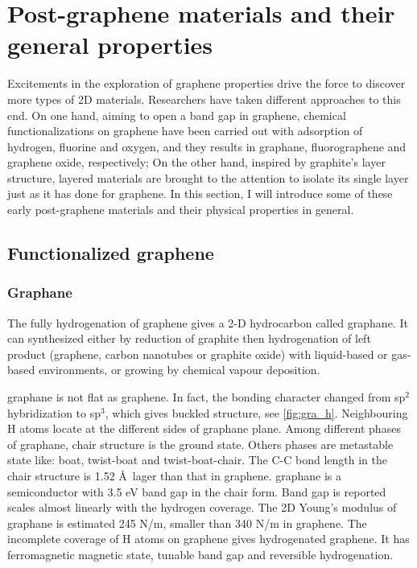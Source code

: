 \section{Post-graphene materials and their general properties}

Excitements in the exploration of graphene properties drive the force to discover more types of 2D materials. Researchers have taken different approaches to this end. On one hand, aiming to open a band gap in graphene, chemical functionalizations on graphene have been carried out with adsorption of hydrogen, fluorine and oxygen, and they results in graphane, fluorographene and graphene oxide, respectively; On the other hand, inspired by graphite's layer structure, layered materials are brought to the attention to isolate its single layer just as it has done for graphene. In this section, I will introduce some of these early post-graphene materials and their physical properties in general.

\subsection{Functionalized graphene}

\subsubsection{Graphane}

The fully hydrogenation of graphene gives a 2-D hydrocarbon called graphane. It can synthesized either by reduction of graphite then hydrogenation of left product (graphene, carbon nanotubes or graphite oxide) with liquid-based\cite{Yang2012} or gas-based\cite{Burgess2011} environments, or growing by chemical vapour deposition\cite{wang2010}. 

graphane is not flat as graphene. In fact, the bonding character changed from sp$^2$ hybridization to sp$^3$, which gives buckled structure, see \autoref{fig:gra_h}. Neighbouring H atoms locate at the different sides of graphane plane. Among different phases of graphane, chair structure is the ground state. Others phases are metastable state like: boat, twist-boat and twist-boat-chair\cite{Samarakoon2009}. The C-C bond length in the chair structure is 1.52 \AA~lager than that in graphene. graphane is a semiconductor with 3.5 eV band gap in the chair form. Band gap is reported scales almost linearly with the hydrogen coverage\cite{Ilyin2011}. The 2D Young's modulus of graphane is estimated 245 \si{N/m}\cite{Munoz2010}, smaller than 340 \si{N/m} in graphene. The incomplete coverage of H atoms on graphene gives hydrogenated graphene. It has ferromagnetic magnetic state\cite{Zhou2009}, tunable band gap\cite{Shkrebtii2011} and reversible hydrogenation\cite{Elias2009}. 


